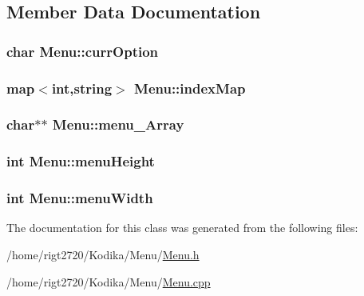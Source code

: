 \subsection{Member Data Documentation}
\hypertarget{classMenu_a8cabd1390fcc59aba53b79788915c792}{
\subsubsection[{curr\-Option}]{\setlength{\rightskip}{0pt plus 5cm}char Menu\-::curr\-Option\hspace{0.3cm}{\ttfamily [protected]}}}\label{classMenu_a8cabd1390fcc59aba53b79788915c792}
\hypertarget{classMenu_a18566c84b43074d03f0ad3cacd748aae}{
\subsubsection[{index\-Map}]{\setlength{\rightskip}{0pt plus 5cm}map$<$int,string$>$ Menu\-::index\-Map\hspace{0.3cm}{\ttfamily [protected]}}}\label{classMenu_a18566c84b43074d03f0ad3cacd748aae}
\hypertarget{classMenu_a6fdd29d716c7fb985f038ddde93794a0}{
\subsubsection[{menu\-\_\-\-Array}]{\setlength{\rightskip}{0pt plus 5cm}char$\ast$$\ast$ Menu\-::menu\-\_\-\-Array\hspace{0.3cm}{\ttfamily [private]}}}\label{classMenu_a6fdd29d716c7fb985f038ddde93794a0}
\hypertarget{classMenu_ad9364e391e91acd266444a2604cb838e}{
\subsubsection[{menu\-Height}]{\setlength{\rightskip}{0pt plus 5cm}int Menu\-::menu\-Height\hspace{0.3cm}{\ttfamily [protected]}}}\label{classMenu_ad9364e391e91acd266444a2604cb838e}
\hypertarget{classMenu_a5c90eda61cd9071dcafda04569dfdd67}{
\subsubsection[{menu\-Width}]{\setlength{\rightskip}{0pt plus 5cm}int Menu\-::menu\-Width\hspace{0.3cm}{\ttfamily [protected]}}}\label{classMenu_a5c90eda61cd9071dcafda04569dfdd67}


The documentation for this class was generated from the following files\-:\begin{DoxyCompactItemize}
\item 
/home/rigt2720/\-Kodika/\-Menu/\hyperlink{Menu_8h}{Menu.\-h}\item 
/home/rigt2720/\-Kodika/\-Menu/\hyperlink{Menu_8cpp}{Menu.\-cpp}\end{DoxyCompactItemize}
